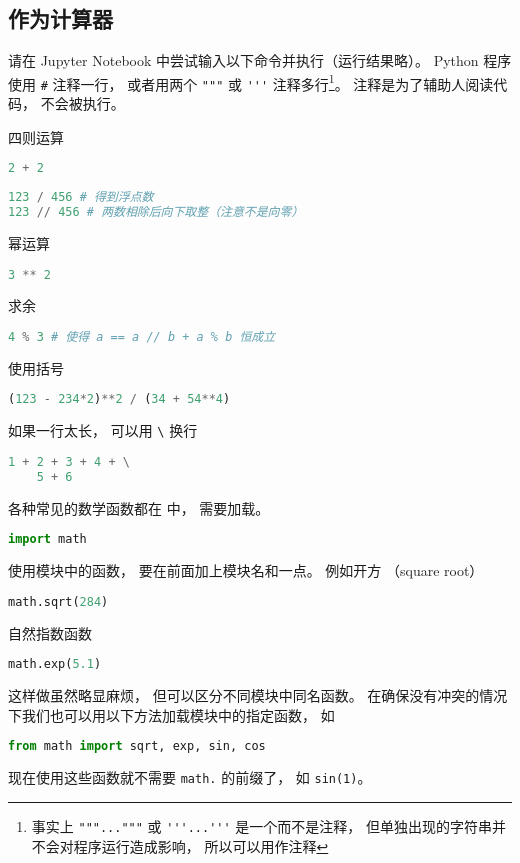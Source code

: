 

\subsection{作为计算器}
请在 Jupyter Notebook 中尝试输入以下命令并执行（运行结果略）。 Python 程序使用 \verb|#| 注释一行，  或者用两个 \verb|"""| 或 \verb|'''| 注释多行\footnote{事实上 \lstinline|"""..."""| 或 \lstinline|'''...'''| 是一个而不是注释， 但单独出现的字符串并不会对程序运行造成影响， 所以可以用作注释}。 注释是为了辅助人阅读代码， 不会被执行。

四则运算
\begin{lstlisting}[language=python]
2 + 2
\end{lstlisting}
\begin{lstlisting}[language=python]
123 / 456 # 得到浮点数
123 // 456 # 两数相除后向下取整（注意不是向零）
\end{lstlisting}
幂运算
\begin{lstlisting}[language=python]
3 ** 2
\end{lstlisting}
求余
\begin{lstlisting}[language=python]
4 % 3 # 使得 a == a // b + a % b 恒成立
\end{lstlisting}
使用括号
\begin{lstlisting}[language=python]
(123 - 234*2)**2 / (34 + 54**4)
\end{lstlisting}
如果一行太长， 可以用 \verb|\| 换行
\begin{lstlisting}[language=python]
1 + 2 + 3 + 4 + \
    5 + 6
\end{lstlisting}
各种常见的数学函数都在 中， 需要加载。
\begin{lstlisting}[language=python]
import math
\end{lstlisting}
使用模块中的函数， 要在前面加上模块名和一点。 例如开方 （square root）
\begin{lstlisting}[language=python]
math.sqrt(284)
\end{lstlisting}
自然指数函数
\begin{lstlisting}[language=python]
math.exp(5.1)
\end{lstlisting}
这样做虽然略显麻烦， 但可以区分不同模块中同名函数。 在确保没有冲突的情况下我们也可以用以下方法加载模块中的指定函数， 如
\begin{lstlisting}[language=python]
from math import sqrt, exp, sin, cos
\end{lstlisting}
现在使用这些函数就不需要 \verb|math.| 的前缀了， 如 \verb|sin(1)|。

